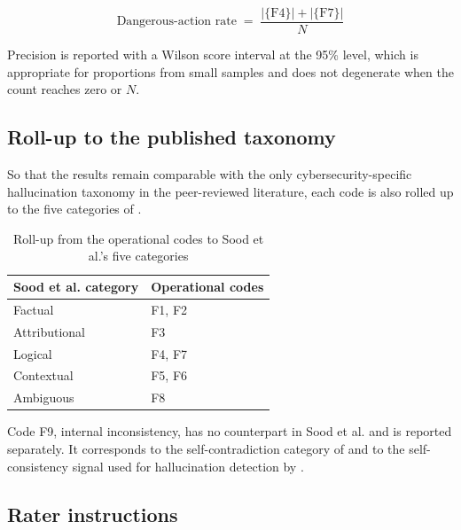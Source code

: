 \begin{equation}
\text{Dangerous-action rate} \;=\; \frac{|\{\text{F4}\}| + |\{\text{F7}\}|}{N}
\label{eq:app-dangerous}
\end{equation}

Precision is reported with a Wilson score interval at the 95\% level, which is
appropriate for proportions from small samples and does not degenerate when the
count reaches zero or $N$.

\subsection{Roll-up to the published taxonomy}

So that the results remain comparable with the only cybersecurity-specific
hallucination taxonomy in the peer-reviewed literature, each code is also rolled up
to the five categories of \citet{sood2025hallucinationparadigm}.

\begin{table}[H]
\centering
\caption{Roll-up from the operational codes to Sood et al.'s five categories}
\label{tab:app-rollup}
\small
\begin{tabularx}{\textwidth}{@{}lX@{}}
\toprule
\textbf{Sood et al. category} & \textbf{Operational codes} \\
\midrule
Factual        & F1, F2 \\
Attributional  & F3 \\
Logical        & F4, F7 \\
Contextual     & F5, F6 \\
Ambiguous      & F8 \\
\bottomrule
\end{tabularx}
\end{table}

Code F9, internal inconsistency, has no counterpart in Sood et al. and is reported
separately. It corresponds to the self-contradiction category of
\citet{massenon2025myaiislying} and to the self-consistency signal used for
hallucination detection by \citet{rapp2025consistencyhallucination}.

\subsection{Rater instructions}

